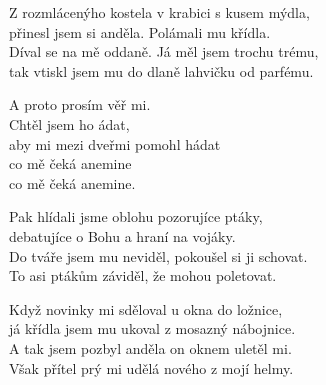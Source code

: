 
\ve{}
Z rozmlácenýho kostela 
v krabici s kusem mýdla,\\
přinesl jsem si anděla. Polámali mu křídla.\\
Díval se na mě oddaně. Já měl jsem 
trochu trému,\\
tak vtiskl jsem mu do dlaně 
lahvičku od parfému.

\cho{}
A proto prosím věř mi.\\
Chtěl jsem ho ádat,\\
aby mi mezi dveřmi pomohl hádat\\
co mě čeká a\qquad {}nemine\quad\\
co mě čeká a\qquad {}nemine.\quad

\ve{}
Pak hlídali jsme oblohu pozorujíce ptáky,\\
debatujíce o Bohu a hraní na vojáky.\\
Do tváře jsem mu neviděl,
pokoušel si ji schovat.\\
To asi ptákům záviděl, že mohou poletovat.

\cho{}

\ve{}
Když novinky mi sděloval u okna do ložnice,\\
já křídla jsem mu ukoval z mosazný nábojnice.\\
A tak jsem pozbyl anděla on oknem uletěl mi.\\
Však přítel prý mi udělá nového z mojí helmy.

\cho{}

\esong{}